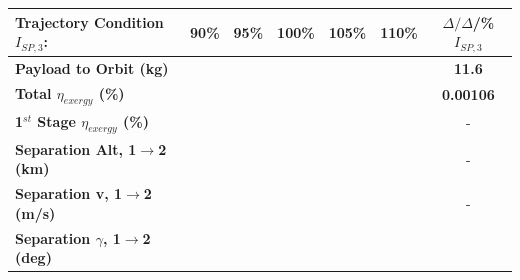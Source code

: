 \begin{table}[ht] %

	\centering
	\begin{tabular}{l c c c c c c} 
		\hline \textbf{Trajectory Condition}   \qquad  $I_{SP,3}$:
		&90\%
		&95\%
		&100\%
		&105\%
		&110\%
		& $\Delta/\Delta$/\%$I_{SP,3}$
		\\
		\hline \textbf{Payload to Orbit (kg)}
		& \textbf{\PayloadToOrbitISPThreeNinetyNoReturn}
		& \textbf{\PayloadToOrbitISPThreeNinetyFiveNoReturn}
		& \textbf{\PayloadToOrbitISPThreeStandardNoReturn}
		& \textbf{\PayloadToOrbitISPThreeOneHundredFiveNoReturn}
		& \textbf{\PayloadToOrbitISPThreeOneHundredTenNoReturn}
		&\textbf{11.6}
		\\
		\textbf{Total $\eta_{exergy}$ (\%)}
		& \textbf{\totalExergyEffISPThreeNinetyNoReturn}
		& \textbf{\totalExergyEffISPThreeNinetyFiveNoReturn}
		& \textbf{\totalExergyEffISPThreeStandardNoReturn}
		& \textbf{\totalExergyEffISPThreeOneHundredFiveNoReturn}
		& \textbf{\totalExergyEffISPThreeOneHundredTenNoReturn}
		& \textbf{0.00106}
		\\
		\hline 
		\textbf{1$^{st}$ Stage $\eta_{exergy}$ (\%)}
		& \textbf{\firstExergyEffISPThreeNinetyNoReturn}
		& \textbf{\firstExergyEffISPThreeNinetyFiveNoReturn}
		& \textbf{\firstExergyEffISPThreeStandardNoReturn}
		& \textbf{\firstExergyEffISPThreeOneHundredFiveNoReturn}
		& \textbf{\firstExergyEffISPThreeOneHundredTenNoReturn}
		& -
		\\
		\textbf{Separation Alt, 1$\rightarrow$2 (km)}
		& \firstsecondSeparationAltISPThreeNinetyNoReturn
		& \firstsecondSeparationAltISPThreeNinetyFiveNoReturn
		& \firstsecondSeparationAltISPThreeStandardNoReturn
		& \firstsecondSeparationAltISPThreeOneHundredFiveNoReturn
		& \firstsecondSeparationAltISPThreeOneHundredTenNoReturn
		& -
		\\
		\textbf{Separation v, 1$\rightarrow$2 (m/s)}
		& \firstsecondSeparationvISPThreeNinetyNoReturn
		& \firstsecondSeparationvISPThreeNinetyFiveNoReturn
		& \firstsecondSeparationvISPThreeStandardNoReturn
		& \firstsecondSeparationvISPThreeOneHundredFiveNoReturn
		& \firstsecondSeparationvISPThreeOneHundredTenNoReturn
		& -
		\\
		\textbf{Separation $\gamma$, 1$\rightarrow$2 (deg)}
		& \firstsecondSeparationgammaISPThreeNinetyNoReturn
		& \firstsecondSeparationgammaISPThreeNinetyFiveNoReturn
		& \firstsecondSeparationgammaISPThreeStandardNoReturn
		& \firstsecondSeparationgammaISPThreeOneHundredFiveNoReturn
		& \firstsecondSeparationgammaISPThreeOneHundredTenNoReturn

\end{tabular}
\end{table}
